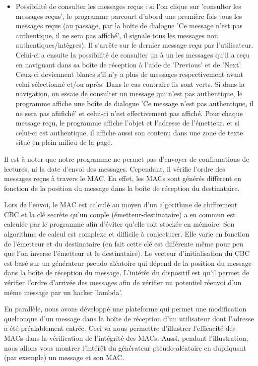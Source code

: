 \begin{itemize}[label=$\cdot$]
    \item Possibilité de consulter les messages reçus : si l'on clique sur 'consulter les messages reçus', le programme parcourt d'abord une première fois tous les messages reçus (au passage, par la boîte de dialogue 'Ce message n'est pas authentique, il ne sera pas affiché', il signale tous les messages non authentiques/intègres). Il s'arrête sur le dernier message reçu par l'utilisateur. Celui-ci a ensuite la possibilité de consulter un à un les messages qu'il a reçu en naviguant dans sa boîte de réception à l'aide de 'Previous' et de 'Next'. Ceux-ci deviennent blancs s'il n'y a plus de messages respectivement avant celui sélectionné et/ou après. Dans le cas contraire ils sont verts. Si dans la navigation, on essaie de consulter un message qui n'est pas authentique, le programme affiche une boîte de dialogue 'Ce message n'est pas authentique, il ne sera pas afiifiché' et celui-ci n'est effectivement pas affiché. Pour chaque message reçu, le programme affiche l'objet et l'adresse de l'émetteur. et si celui-ci est authentique, il affiche aussi son contenu dans une zone de texte situé en plein milieu de la page.
\end{itemize}

Il est à noter que notre programme ne permet pas d'envoyer de confirmations de lectures, ni la date d'envoi des messages. Cependant, il vérifie l'ordre des messages reçus à travers le MAC. En effet, les MACs sont générés diffèrent en fonction de la position du message dans la boîte de réception du destinataire.

Lors de l'envoi, le MAC est calculé au moyen d'un algorithme de chiffrement CBC et la clé secrète qu'un couple (émetteur-destinataire) a en commun est calculée par le programme afin d'éviter qu'elle soit stockée en mémoire. Son algorithme de calcul est complexe et difficile à conjecturer. Elle varie en fonction de l'émetteur et du destinataire (en fait cette clé est différente même pour peu que l'on inverse l'émetteur et le destinataire). Le vecteur d'initialisation du CBC est basé sur un générateur pseudo aléatoire qui dépend de la position du message dans la boîte de réception du message. 
L'intérêt du dispositif est qu'il permet de vérifier l'ordre d'arrivée des messages afin de vérifier un potentiel réenvoi d'un même message par un hacker 'lambda'.

En parallèle, nous avons développé une plateforme qui permet une modification quelconque d'un message dans la boîte de réception d'un utilisateur dont l'adresse a été préalablement entrée. Ceci va nous permettre d'illustrer l'efficacité des MACs dans la vérification de l'intégrité des MACs. Aussi, pendant l'illustration, nous allons vous montrer l'intérêt du générateur pseudo-aléatoire en dupliquant (par exemple) un message et son MAC.

